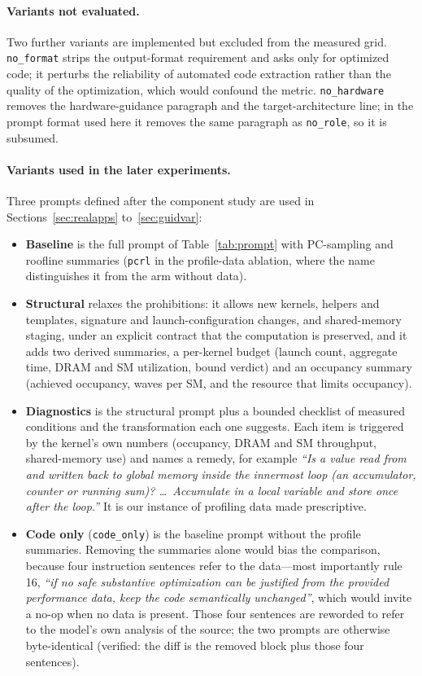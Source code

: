 \paragraph{Variants not evaluated.}
Two further variants are implemented but excluded from the measured grid. \texttt{no\_format} strips
the output-format requirement and asks only for optimized code; it perturbs the reliability of
automated code extraction rather than the quality of the optimization, which would confound the metric.
\texttt{no\_hardware} removes the hardware-guidance paragraph and the target-architecture line; in the
prompt format used here it removes the same paragraph as \texttt{no\_role}, so it is subsumed.

\paragraph{Variants used in the later experiments.}
Three prompts defined after the component study are used in Sections~\ref{sec:realapps}
to~\ref{sec:guidvar}:
\begin{itemize}\itemsep2pt
  \item \textbf{Baseline} is the full prompt of Table~\ref{tab:prompt} with PC-sampling and roofline
    summaries (\texttt{pcrl} in the profile-data ablation, where the name distinguishes it from the arm
    without data).
  \item \textbf{Structural} relaxes the prohibitions: it allows new kernels, helpers and templates,
    signature and launch-configuration changes, and shared-memory staging, under an explicit contract
    that the computation is preserved, and it adds two derived summaries, a per-kernel budget (launch
    count, aggregate time, DRAM and SM utilization, bound verdict) and an occupancy summary (achieved
    occupancy, waves per SM, and the resource that limits occupancy).
  \item \textbf{Diagnostics} is the structural prompt plus a bounded checklist of measured conditions
    and the transformation each one suggests. Each item is triggered by the kernel's own numbers
    (occupancy, DRAM and SM throughput, shared-memory use) and names a remedy, for example
    \textit{``Is a value read from and written back to global memory inside the innermost loop (an
    accumulator, counter or running sum)? \ldots\ Accumulate in a local variable and store once after
    the loop.''} It is our instance of profiling data made prescriptive.
  \item \textbf{Code only} (\texttt{code\_only}) is the baseline prompt without the profile summaries.
    Removing the summaries alone would bias the comparison, because four instruction sentences refer to
    the data---most importantly rule 16, \textit{``if no safe substantive optimization can be
    justified from the provided performance data, keep the code semantically unchanged''}, which would
    invite a no-op when no data is present. Those four sentences are reworded to refer to the model's
    own analysis of the source; the two prompts are otherwise byte-identical (verified: the diff is the
    removed block plus those four sentences).
\end{itemize}

